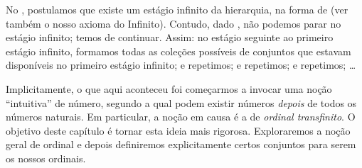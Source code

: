 \documentclass[../../../include/open-logic-section]{subfiles}
\begin{document}


No , postulamos que existe um estágio infinito
da hierarquia, na forma de \stagesinf{} (ver também o nosso axioma do
Infinito). Contudo, dado \stagessucc{}, não podemos parar no estágio
infinito; temos de continuar. Assim: no estágio seguinte ao primeiro estágio
infinito, formamos todas as coleções possíveis de conjuntos
que estavam disponíveis no primeiro estágio infinito; e repetimos; e
repetimos; e repetimos; \dots

Implicitamente, o que aqui aconteceu foi começarmos a invocar uma noção
``intuitiva'' de número, segundo a qual podem existir números
\emph{depois} de todos os números naturais. Em particular, a noção em
causa é a de \emph{ordinal transfinito}. O objetivo deste capítulo é
tornar esta ideia mais rigorosa. Exploraremos a noção geral de ordinal e
depois definiremos explicitamente certos conjuntos para serem os nossos
ordinais. 
\end{document}
